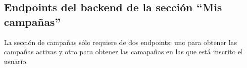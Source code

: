 \subsection{Endpoints del backend de la sección ``Mis campañas''}
La sección de campañas sólo requiere de dos endpoints: uno para obtener las campañas activas y otro para obtener las camapañas en las que está inscrito el usuario.
    
    